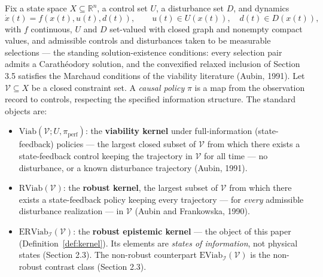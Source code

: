 \documentclass[10pt,twocolumn]{article}
\theoremstyle{definition}
\providecommand{\tightlist}{\setlength{\itemsep}{0pt}\setlength{\parskip}{0pt}}
\begin{document}
Fix a state space \(X \subseteq \mathbb{R}^n\), a control set \(U\), a
disturbance set \(D\), and dynamics
\[\dot x(t) = f(x(t), u(t), d(t)), \qquad u(t) \in U(x(t)), \quad d(t) \in D(x(t)),\]
with \(f\) continuous, \(U\) and \(D\) set-valued with closed graph and
nonempty compact values, and admissible controls and disturbances taken
to be measurable selections --- the standing solution-existence conditions:
every selection pair admits a Carath\'eodory solution, and the
convexified relaxed inclusion of Section 3.5 satisfies the Marchaud
conditions of the viability literature (Aubin, 1991). Let \(\mathcal{V} \subseteq X\) be a closed
constraint set. A \emph{causal policy} \(\pi\) is a map from the
observation record to controls, respecting the specified information structure. The standard objects are:

\begin{itemize}
\tightlist
\item
  \(\mathrm{Viab}(\mathcal{V}; U, \pi_{\mathrm{perf}})\): the
  \textbf{viability kernel} under full-information (state-feedback)
  policies --- the largest closed subset of \(\mathcal{V}\) from which
  there exists a state-feedback control keeping the trajectory in
  \(\mathcal{V}\) for all time --- no disturbance, or a known
  disturbance trajectory (Aubin, 1991).
\item
  \(\mathrm{RViab}(\mathcal{V})\): the \textbf{robust kernel}, the
  largest subset of \(\mathcal{V}\) from which there exists a
  state-feedback policy keeping every trajectory --- for \emph{every}
  admissible disturbance realization --- in \(\mathcal{V}\) (Aubin and
  Frankowska, 1990).
\item
  \(\mathrm{ERViab}_{\mathcal{I}}(\mathcal{V})\): the \textbf{robust
  epistemic kernel} --- the object of this paper (Definition~\ref{def:kernel}). Its
  elements are \emph{states of information}, not physical states
  (Section 2.3). The non-robust counterpart
  \(\mathrm{EViab}_{\mathcal{I}}(\mathcal{V})\) is the non-robust contrast class (Section 2.3).
\end{itemize}
\end{document}
